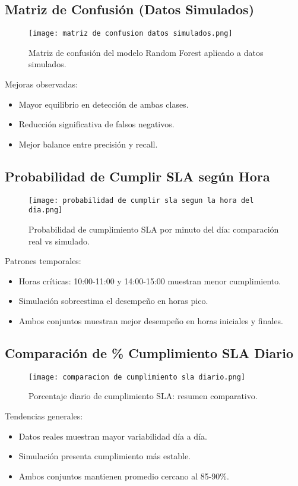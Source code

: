 \documentclass[12pt]{article}
\begin{document}
\subsection{Matriz de Confusión (Datos Simulados)}
\begin{figure}[H]
  \centering
  \texttt{[image: matriz de confusion datos simulados.png]}
  \caption{Matriz de confusión del modelo Random Forest aplicado a datos simulados.}
\end{figure}
\noindent
Mejoras observadas:
\begin{itemize}
  \item Mayor equilibrio en detección de ambas clases.
  \item Reducción significativa de falsos negativos.
  \item Mejor balance entre precisión y recall.
\end{itemize}

\subsection{Probabilidad de Cumplir SLA según Hora}
\begin{figure}[H]
  \centering
  \texttt{[image: probabilidad de cumplir sla segun la hora del dia.png]}
  \caption{Probabilidad de cumplimiento SLA por minuto del día: comparación real vs simulado.}
\end{figure}
\noindent
Patrones temporales:
\begin{itemize}
  \item Horas críticas: 10:00-11:00 y 14:00-15:00 muestran menor cumplimiento.
  \item Simulación sobreestima el desempeño en horas pico.
  \item Ambos conjuntos muestran mejor desempeño en horas iniciales y finales.
\end{itemize}

\subsection{Comparación de \% Cumplimiento SLA Diario}
\begin{figure}[H]
  \centering
  \texttt{[image: comparacion de cumplimiento sla diario.png]}
  \caption{Porcentaje diario de cumplimiento SLA: resumen comparativo.}
\end{figure}
\noindent
Tendencias generales:
\begin{itemize}
  \item Datos reales muestran mayor variabilidad día a día.
  \item Simulación presenta cumplimiento más estable.
  \item Ambos conjuntos mantienen promedio cercano al 85-90\%.
\end{itemize}
\end{document}
